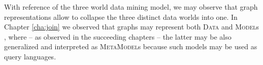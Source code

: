 %
%
%
%
%
%
%

With reference of the three world data mining model, we may observe that graph representations allow to collapse the three distinct data worlds into one. In Chapter \vref{cha:join} we observed that graphs may represent both \textsc{Data} and \textsc{Model}s , where -- as observed in the succeeding chapters -- the latter may be also generalized and interpreted as \textsc{MetaModel}s  because such models may be used as query languages. 


